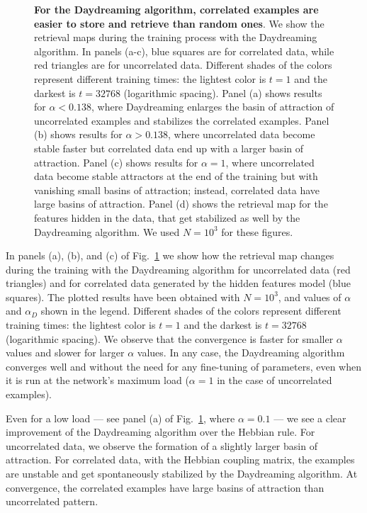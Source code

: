 \documentclass[a4paper]{cas-sc}
\begin{document}
\begin{figure}
\caption{\textbf{For the Daydreaming algorithm, correlated examples are easier to store and retrieve than random ones}. We show the retrieval maps during the training process with the Daydreaming algorithm. In panels (a-c), blue squares are for correlated data, while red triangles are for uncorrelated data. Different shades of the colors represent different training times: the lightest color is $t=1$ and the darkest is $t=32768$ (logarithmic spacing). 
Panel (a) shows results for $\alpha<0.138$, where Daydreaming enlarges the basin of attraction of uncorrelated examples and stabilizes the correlated examples.
Panel (b) shows results for $\alpha>0.138$, where uncorrelated data become stable faster but correlated data end up with a larger basin of attraction.
Panel (c) shows results for $\alpha=1$, where uncorrelated data become stable attractors at the end of the training but with vanishing small basins of attraction; instead, correlated data have large basins of attraction.
Panel (d) shows the retrieval map for the features hidden in the data, that get stabilized as well by the Daydreaming algorithm.
We used $N=10^3$ for these figures.
}
\label{fig:results}
\end{figure}

In panels (a), (b), and (c) of Fig.~\ref{fig:results} we show how the retrieval map changes during the training with the Daydreaming algorithm for uncorrelated data (red triangles) and for correlated data generated by the hidden features model (blue squares). The plotted results have been obtained with $N=10^3$, and values of $\alpha$ and $\alpha_D$ shown in the legend. Different shades of the colors represent different training times: the lightest color is $t=1$ and the darkest is $t=32768$ (logarithmic spacing). We observe that the convergence is faster for smaller $\alpha$ values and slower for larger $\alpha$ values. In any case, the Daydreaming algorithm converges well and without the need for any fine-tuning of parameters, even when it is run at the network's maximum load ($\alpha=1$ in the case of uncorrelated examples).

Even for a low load --- see panel (a) of Fig.~\ref{fig:results}, where $\alpha=0.1$ --- we see a clear improvement of the Daydreaming algorithm over the Hebbian rule. For uncorrelated data, we observe the formation of a slightly larger basin of attraction. For correlated data, with the Hebbian coupling matrix, the examples are unstable and get spontaneously stabilized by the Daydreaming algorithm. At convergence, the correlated examples have large basins of attraction than uncorrelated pattern.
\end{document}

